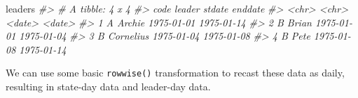 \documentclass[
  11pt,
]{article}
\newenvironment{Shaded}{\begin{snugshade}}{\end{snugshade}}
\newcommand{\CommentTok}[1]{\textcolor[rgb]{0.56,0.35,0.01}{\textit{#1}}}
\newcommand{\NormalTok}[1]{#1}
\begin{document}
\begin{Shaded}
\begin{Highlighting}[]
\NormalTok{leaders}
\CommentTok{\#\textgreater{} \# A tibble: 4 x 4}
\CommentTok{\#\textgreater{}   code  leader    stdate     enddate   }
\CommentTok{\#\textgreater{}   \textless{}chr\textgreater{} \textless{}chr\textgreater{}     \textless{}date\textgreater{}     \textless{}date\textgreater{}    }
\CommentTok{\#\textgreater{} 1 A     Archie    1975{-}01{-}01 1975{-}01{-}14}
\CommentTok{\#\textgreater{} 2 B     Brian     1975{-}01{-}01 1975{-}01{-}04}
\CommentTok{\#\textgreater{} 3 B     Cornelius 1975{-}01{-}04 1975{-}01{-}08}
\CommentTok{\#\textgreater{} 4 B     Pete      1975{-}01{-}08 1975{-}01{-}14}
\end{Highlighting}
\end{Shaded}

We can use some basic \texttt{rowwise()} transformation to recast these data as daily, resulting in state-day data and leader-day data.
\end{document}
